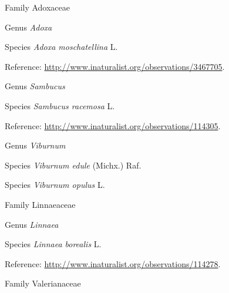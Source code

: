 \documentclass[9pt, article]{memoir}
\begin{document}
\begin{multicols}{2}
\vspace{6pt}\noindent\hspace{24pt}Family Adoxaceae


\vspace{6pt}\noindent\hspace{30pt}Genus \textit{Adoxa}


\vspace{6pt}\noindent\hspace{36pt}Species \textit{Adoxa moschatellina} L.


\vspace{6pt}Reference: 
\url{http://www.inaturalist.org/observations/3467705}.

\vspace{6pt}\noindent\hspace{30pt}Genus \textit{Sambucus}


\vspace{6pt}\noindent\hspace{36pt}Species \textit{Sambucus racemosa} L.


\vspace{6pt}Reference: 
\url{http://www.inaturalist.org/observations/114305}.

\vspace{6pt}\noindent\hspace{30pt}Genus \textit{Viburnum}


\vspace{6pt}\noindent\hspace{36pt}Species \textit{Viburnum edule} (Michx.) Raf.


\vspace{6pt}\noindent\hspace{36pt}Species \textit{Viburnum opulus} L.


\vspace{6pt}\noindent\hspace{24pt}Family Linnaeaceae


\vspace{6pt}\noindent\hspace{30pt}Genus \textit{Linnaea}


\vspace{6pt}\noindent\hspace{36pt}Species \textit{Linnaea borealis} L.


\vspace{6pt}Reference: 
\url{http://www.inaturalist.org/observations/114278}.

\vspace{6pt}\noindent\hspace{24pt}Family Valerianaceae



\end{multicols}
\end{document}
